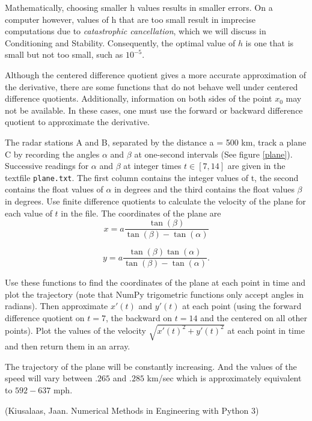 \begin{warn}
Mathematically, choosing smaller h values results in smaller errors.
On a computer however, values of h that are too small result in imprecise computations due to \emph{catastrophic cancellation}, which we will discuss in Conditioning and Stability. Consequently, the optimal value of $h$ is one that is small but not too small, such as $10^{-5}$.
\end{warn}

Although the centered difference quotient gives a more accurate approximation of the derivative, there are some functions that do not behave well under centered difference quotients.
Additionally, information on both sides of the point $x_0$ may not be available.
In these cases, one must use the forward or backward difference quotient to approximate the derivative.

\begin{problem}
The radar stations A and B, separated by the distance a = 500 km, track a plane C by recording the angles $\alpha$ and $\beta$ at one-second intervals (See figure \ref{plane}).
Successive readings for $\alpha$ and $\beta$ at integer times $t \in [7, 14]$ are given in the textfile \texttt{plane.txt}.
The first column contains the integer values of t, the second contains the float values of $\alpha$ in degrees and the third contains the float values $\beta$ in degrees.
Use finite difference quotients to calculate the velocity of the plane for each value of $t$ in the file.
The coordinates of the plane are
\begin{equation}
x = a \frac{\tan(\beta)}{\tan(\beta)-\tan(\alpha)}
\end{equation}

\begin{equation}
 y = a \frac{\tan(\beta)\tan(\alpha)}{\tan(\beta)-\tan(\alpha)}.
\end{equation}

Use these functions to find the coordinates of the plane at each point in time and plot the trajectory (note that NumPy trigometric functions only accept angles in radians).  Then approximate $x'(t)$ and $y'(t)$ at each point (using the forward difference quotient on $t = 7$, the backward on $t=14$ and the centered on all other points). Plot the values of the velocity $\sqrt{x'(t)^2+y'(t)^2}$ at each point in time and then return them in an array.

The trajectory of the plane will be constantly increasing. And the values of the speed will vary between $.265$ and $.285$ km/sec which is approximately equivalent to $592-637$ mph.

(Kiusalaas, Jaan. Numerical Methods in Engineering with Python 3)
\end{problem}

